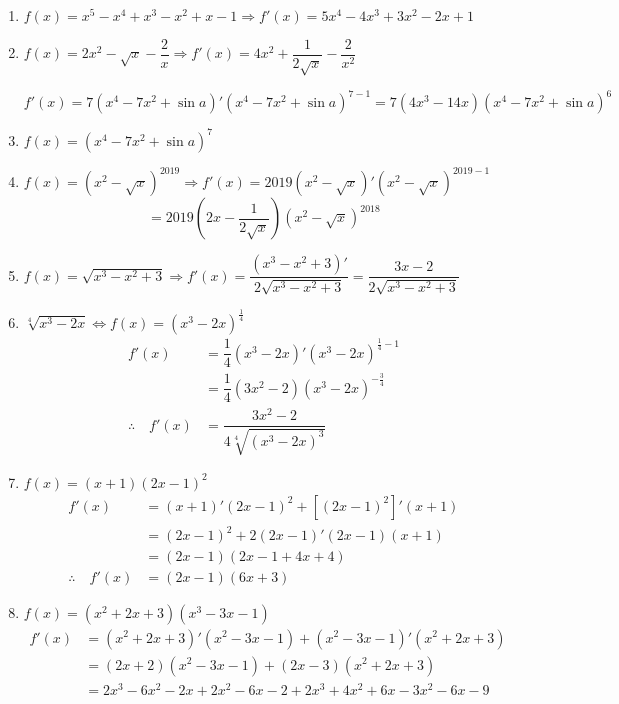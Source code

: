 \documentclass[a4paper,12pt]{article}
\begin{document}
\solution
\begin{enumerate}
	\item $f(x)=x^5-x^4+x^3-x^2+x-1 \Longrightarrow f'(x)=5x^4-4x^3+3x^2-2x+1$
	\item $f(x)=2x^2-\sqrt{x}-\dfrac{2}{x}\Longrightarrow f'(x)=4x^2+\dfrac{1}{2\sqrt{x}}-\dfrac{2}{x^2}$
	      \begin{center}
		      $f'(x)=7(x^4-7x^2+\sin a)'(x^4-7x^2+\sin a)^{7-1}=7(4x^3-14x)(x^4-7x^2+\sin a)^6$
	      \end{center}

	\item $f(x)=(x^4-7x^2+\sin a)^7$
	\item $f(x)=(x^2-\sqrt{x})^{2019}\Longrightarrow f'(x)=2019(x^2-\sqrt{x})'(x^2-\sqrt{x})^{2019-1}$
	      $$=2019\left(2x-\dfrac{1}{2\sqrt{x}}\right)(x^2-\sqrt{x})^{2018}$$
	\item $f(x)=\sqrt{x^3-x^2+3}\Longrightarrow f'(x)=\dfrac{(x^3-x^2+3)'}{2\sqrt{x^3-x^2+3}}=\dfrac{3x-2}{2\sqrt{x^3-x^2+3}}$
	\item $\sqrt[4]{x^3-2x} \Longleftrightarrow f(x)=(x^3-2x)^{\frac{1}{4}}$
	      \begin{align*}
		      f'(x)                  & =\dfrac{1}{4}(x^3-2x)'(x^3-2x)^{\frac{1}{4}-1} \\
		                             & =\dfrac{1}{4}(3x^2-2)(x^3-2x)^{-\frac{3}{4}}   \\
		      \therefore \quad f'(x) & =\dfrac{3x^2-2}{4\sqrt[4]{(x^3-2x)^3}}
	      \end{align*}
	\item $f(x)=(x+1)(2x-1)^2$
	      \begin{align*}
		      f'(x)                  & =(x+1)'(2x-1)^2+[(2x-1)^2]'(x+1) \\
		                             & =(2x-1)^2+2(2x-1)'(2x-1)(x+1)    \\
		                             & =(2x-1)(2x-1+4x+4)               \\
		      \therefore \quad f'(x) & =(2x-1)(6x+3)
	      \end{align*}
	\item $f(x)=(x^2+2x+3)(x^3-3x-1)$
	      \begin{align*}
		      f'(x)                  & =(x^2+2x+3)'(x^2-3x-1)+(x^2-3x-1)'(x^2+2x+3)   \\
		                             & =(2x+2)(x^2-3x-1)+(2x-3)(x^2+2x+3)             \\
		                             & =2x^3-6x^2-2x+2x^2-6x-2+2x^3+4x^2+6x-3x^2-6x-9 \\

\end{align*}
\end{enumerate}
\end{document}
